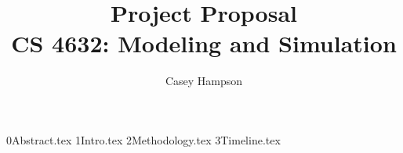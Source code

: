 \documentclass[titlepage]{article}
\title{Project Proposal \\[5pt] CS 4632: Modeling and Simulation}
\author{Casey Hampson}
\begin{document}
    \maketitle
    \pagebreak

    {0Abstract.tex}
    {1Intro.tex}
    {2Methodology.tex}
    {3Timeline.tex}

    \printbibliography
\end{document}
